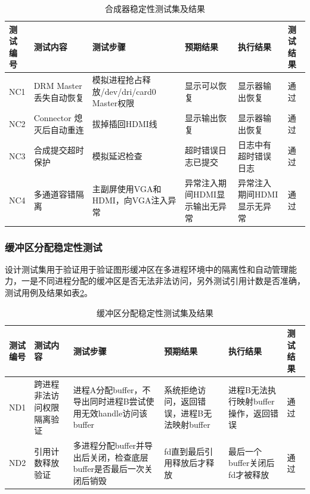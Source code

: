\begin{table}[H]
  \centering
  \caption{合成器稳定性测试集及结果}
  \label{tab:合成器驱动稳定性测试}
  \begin{tabular}{lp{3cm}p{3cm}p{2cm}p{2cm}l}
    \toprule
    \makecell[l]{测试\\编号} & 测试内容  &  测试步骤  & 预期结果 & 执行结果 & 测试结果\\
    \midrule
    NC1 & DRM Master 丢失自动恢复 & 模拟进程抢占释放/dev/dri/card0 Master权限 & 显示可以恢复 & 显示器输出恢复 & 通过\\
    NC2 & Connector 熄灭后自动重连 & 拔掉插回HDMI线 & 显示输出恢复 & 显示器输出恢复 & 通过\\
    NC3 & 合成提交超时保护 & 模拟延迟检查 & 超时错误日志已提交 & 日志中有超时错误日志 & 通过\\
    NC4 & 多通道容错隔离 & 主副屏使用VGA和HDMI，向VGA注入异常 & 异常注入期间HDMI显示输出无异常 & 异常注入期间HDMI显示无异常 & 通过\\
    \bottomrule
  \end{tabular}
  \note{}
\end{table}

\subsubsection{缓冲区分配稳定性测试}

设计测试集用于验证用于验证图形缓冲区在多进程环境中的隔离性和自动管理能力，一是不同进程分配的缓冲区是否无法非法访问，另外测试引用计数是否准确，测试用例及结果如表\ref{tab:缓冲区稳定性测试}。

\begin{table}[H]
  \centering
  \caption{缓冲区分配稳定性测试集及结果}
  \label{tab:缓冲区稳定性测试}
  \begin{tabular}{lp{3cm}p{3cm}p{2cm}p{2cm}l}
    \toprule
    \makecell[l]{测试\\编号} & 测试内容  &  测试步骤  & 预期结果 & 执行结果 & 测试结果\\
    \midrule
    ND1 & 跨进程非法访问权限隔离验证 & 进程A分配buffer，不导出同时进程B尝试使用无效handle访问该buffer & 系统拒绝访问，返回错误，进程B无法映射buffer & 进程B无法执行映射buffer操作，返回错误 & 通过\\
    ND2 & 引用计数释放验证 & 多进程分配buffer并导出后关闭，检查底层buffer是否最后一次关闭后销毁 & fd直到最后引用释放后才释放 & 最后一个buffer关闭后fd才被释放 & 通过\\
    \bottomrule
  \end{tabular}
  \note{}
\end{table}



